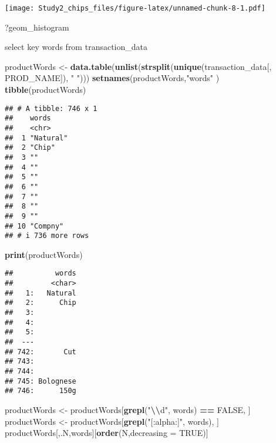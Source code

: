 \documentclass[
]{article}
\newenvironment{Shaded}{\begin{snugshade}}{\end{snugshade}}
\newcommand{\AttributeTok}[1]{\textcolor[rgb]{0.13,0.29,0.53}{#1}}
\newcommand{\ConstantTok}[1]{\textcolor[rgb]{0.56,0.35,0.01}{#1}}
\newcommand{\FunctionTok}[1]{\textcolor[rgb]{0.13,0.29,0.53}{\textbf{#1}}}
\newcommand{\NormalTok}[1]{#1}
\newcommand{\OtherTok}[1]{\textcolor[rgb]{0.56,0.35,0.01}{#1}}
\newcommand{\SpecialCharTok}[1]{\textcolor[rgb]{0.81,0.36,0.00}{\textbf{#1}}}
\newcommand{\StringTok}[1]{\textcolor[rgb]{0.31,0.60,0.02}{#1}}
\begin{document}
\texttt{[image: Study2\_chips\_files/figure-latex/unnamed-chunk-8-1.pdf]}

\begin{Shaded}
\begin{Highlighting}[]
\NormalTok{?geom\_histogram}
\end{Highlighting}
\end{Shaded}

select key words from transaction\_data

\begin{Shaded}
\begin{Highlighting}[]
\NormalTok{productWords }\OtherTok{\textless{}{-}} \FunctionTok{data.table}\NormalTok{(}\FunctionTok{unlist}\NormalTok{(}\FunctionTok{strsplit}\NormalTok{(}\FunctionTok{unique}\NormalTok{(transaction\_data[,}
\NormalTok{PROD\_NAME]), }\StringTok{" "}\NormalTok{)))}
\FunctionTok{setnames}\NormalTok{(productWords,}\StringTok{"words"}\NormalTok{ )}
\FunctionTok{tibble}\NormalTok{(productWords)}
\end{Highlighting}
\end{Shaded}

\begin{verbatim}
## # A tibble: 746 x 1
##    words    
##    <chr>    
##  1 "Natural"
##  2 "Chip"   
##  3 ""       
##  4 ""       
##  5 ""       
##  6 ""       
##  7 ""       
##  8 ""       
##  9 ""       
## 10 "Compny" 
## # i 736 more rows
\end{verbatim}

\begin{Shaded}
\begin{Highlighting}[]
\FunctionTok{print}\NormalTok{(productWords)}
\end{Highlighting}
\end{Shaded}

\begin{verbatim}
##          words
##         <char>
##   1:   Natural
##   2:      Chip
##   3:          
##   4:          
##   5:          
##  ---          
## 742:       Cut
## 743:          
## 744:          
## 745: Bolognese
## 746:      150g
\end{verbatim}

\begin{Shaded}
\begin{Highlighting}[]
\NormalTok{productWords }\OtherTok{\textless{}{-}}\NormalTok{ productWords[}\FunctionTok{grepl}\NormalTok{(}\StringTok{"}\SpecialCharTok{\textbackslash{}\textbackslash{}}\StringTok{d"}\NormalTok{, words) }\SpecialCharTok{==} \ConstantTok{FALSE}\NormalTok{, ]}
\NormalTok{productWords }\OtherTok{\textless{}{-}}\NormalTok{ productWords[}\FunctionTok{grepl}\NormalTok{(}\StringTok{"[:alpha:]"}\NormalTok{, words), ]}
\NormalTok{productWords[,.N,words][}\FunctionTok{order}\NormalTok{(N,}\AttributeTok{decreasing =} \ConstantTok{TRUE}\NormalTok{)]}
\end{Highlighting}
\end{Shaded}
\end{document}
